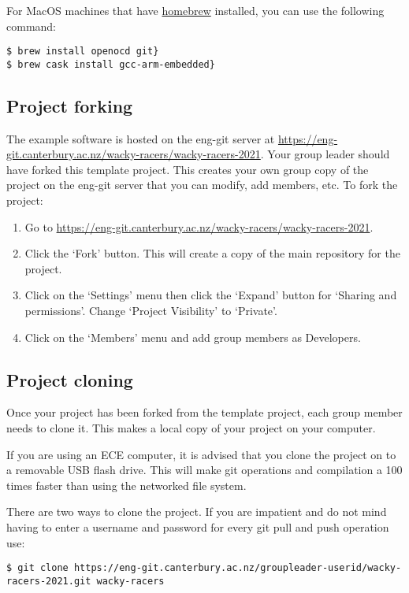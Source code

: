 For MacOS machines that have \href{https://brew.sh}{homebrew} installed,
you can use the following command:

\begin{verbatim}
$ brew install openocd git}
$ brew cask install gcc-arm-embedded}
\end{verbatim}

\subsection{Project forking}
\label{project-forking}

The example software is hosted on the eng-git  server at
\href{https://eng-git.canterbury.ac.nz/wacky-racers/wacky-racers-2021}{\url{https://eng-git.canterbury.ac.nz/wacky-racers/wacky-racers-2021}}.
Your group leader should have forked this template project. This creates
your own group copy of the project on the eng-git server that you can
modify, add members, etc. To fork the project:

\begin{enumerate}
\item
  Go to
  \href{https://eng-git.canterbury.ac.nz/wacky-racers/wacky-racers-2021}{\url{https://eng-git.canterbury.ac.nz/wacky-racers/wacky-racers-2021}}.
\item
  Click the `Fork' button. This will create a copy of the main repository
  for the project.
\item
  Click on the `Settings' menu then click the `Expand' button for
  `Sharing and permissions'. Change `Project Visibility' to `Private'.
\item
  Click on the `Members' menu and add group members as Developers.
\end{enumerate}

\subsection{Project cloning}
\label{project-cloning}

Once your project has been forked from the template project, each group
member needs to clone it. This makes a local copy of your project on
your computer. 

If you are using an ECE computer, it is advised that you clone the
project on to a removable USB flash drive. This will make git operations
and compilation a 100 times faster than using the networked file system.

There are two ways to clone the project. If you are impatient and do not
mind having to enter a username and password for every git pull and push
operation use:
%
\begin{verbatim}
$ git clone https://eng-git.canterbury.ac.nz/groupleader-userid/wacky-racers-2021.git wacky-racers
\end{verbatim}

